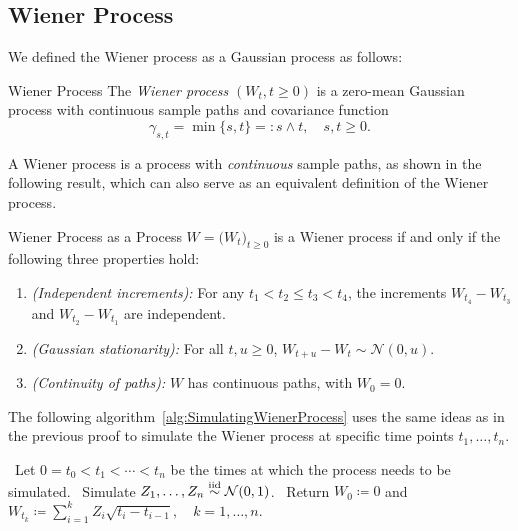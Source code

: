 \subsection{Wiener Process}

We defined the Wiener process as a Gaussian process as follows:
\begin{defn}{Wiener Process}{}
	The \textit{Wiener process} \((W_t, t \geq 0)\) is a zero-mean Gaussian process with continuous sample paths and covariance function
	\begin{equation}
		\label{eq:WienerProcessCovarianceFunction}
		\gamma_{s,t} = \min\{s, t\} =: s \wedge t, \quad s, t \geq 0.
	\end{equation}
\end{defn}

A Wiener process is a {\Levy} process with \textit{continuous} sample paths, as shown in the following result, which can also serve as an equivalent definition of the Wiener process.

\begin{thm}{Wiener Process as a {\Levy} Process}{}
	\(W = {\bigl(W_t\bigr)}_{t \geq 0}\) is a Wiener process if and only if the following three properties hold:
	\begin{enumerate}
		\item \textit{(Independent increments):} For any \(t_1 < t_2 \leq t_3 < t_4\), the increments \(W_{t_4} - W_{t_3}\) and \(W_{t_2} - W_{t_1}\) are independent.
		\item \textit{(Gaussian stationarity):} For all \(t, u \geq 0\), \(W_{t+u} - W_t \sim \mathcal{N}(0, u)\).
		\item \textit{(Continuity of paths):} \(W\) has continuous paths, with \(W_0 = 0\).
	\end{enumerate}
\end{thm}

The following algorithm~\cref{alg:SimulatingWienerProcess} uses the same ideas as in the previous proof to simulate the Wiener process at specific time points \(t_1,\ldots,t_n\).

\begin{algorithm}[H]
	\caption{Simulating a Wiener Process}\label{alg:SimulatingWienerProcess}
	\begin{algorithmic}[1]
		\State~Let \(0 = t_0 < t_1 < \cdots < t_n\) be the times at which the process needs to be simulated.
		\State~Simulate \(Z_1, \ldots, Z_n \stackrel{\mathrm{iid}}{\sim} \mathcal{N}(0, 1)\).
		\State~Return \(W_0 \coloneqq 0\) and \(W_{t_k} \coloneqq \sum_{i=1}^k Z_i \sqrt{t_i - t_{i-1}}, \quad k = 1, \ldots, n\).
	\end{algorithmic}
\end{algorithm}

